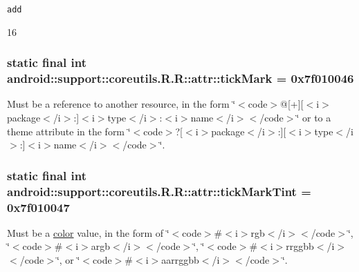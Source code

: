 {\tt add}

16\hypertarget{classandroid_1_1support_1_1coreutils_1_1_r_1_1attr_c07a9a4ca404fe86115a2829e905acd6}{
\subsubsection[{tickMark}]{\setlength{\rightskip}{0pt plus 5cm}static final int android::support::coreutils.R.R::attr::tickMark = 0x7f010046}}
\label{classandroid_1_1support_1_1coreutils_1_1_r_1_1attr_c07a9a4ca404fe86115a2829e905acd6}


Must be a reference to another resource, in the form \char`\"{}$<$code$>$@\mbox{[}+\mbox{]}\mbox{[}$<$i$>$package$<$/i$>$:\mbox{]}$<$i$>$type$<$/i$>$:$<$i$>$name$<$/i$>$$<$/code$>$\char`\"{} or to a theme attribute in the form \char`\"{}$<$code$>$?\mbox{[}$<$i$>$package$<$/i$>$:\mbox{]}\mbox{[}$<$i$>$type$<$/i$>$:\mbox{]}$<$i$>$name$<$/i$>$$<$/code$>$\char`\"{}. \hypertarget{classandroid_1_1support_1_1coreutils_1_1_r_1_1attr_bc8fe434aba4013834003b01b7ba0f4f}{
\subsubsection[{tickMarkTint}]{\setlength{\rightskip}{0pt plus 5cm}static final int android::support::coreutils.R.R::attr::tickMarkTint = 0x7f010047}}
\label{classandroid_1_1support_1_1coreutils_1_1_r_1_1attr_bc8fe434aba4013834003b01b7ba0f4f}


Must be a \hyperlink{classandroid_1_1support_1_1coreutils_1_1_r_1_1color}{color} value, in the form of \char`\"{}$<$code$>$\#$<$i$>$rgb$<$/i$>$$<$/code$>$\char`\"{}, \char`\"{}$<$code$>$\#$<$i$>$argb$<$/i$>$$<$/code$>$\char`\"{}, \char`\"{}$<$code$>$\#$<$i$>$rrggbb$<$/i$>$$<$/code$>$\char`\"{}, or \char`\"{}$<$code$>$\#$<$i$>$aarrggbb$<$/i$>$$<$/code$>$\char`\"{}. 

